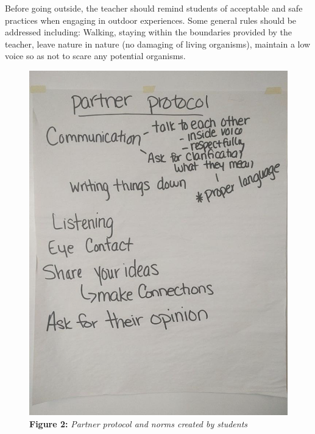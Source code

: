 \documentclass[11pt]{sig-alternate}
\begin{document}
\begin{large}
Before going outside, the teacher should remind students of acceptable and safe practices when engaging in outdoor experiences. Some general rules should be addressed including: Walking, staying within the boundaries provided by the teacher, leave nature in nature (no damaging of living organisms), maintain a low voice so as not to scare any potential organisms. 

\begin{figure}[h!]
    \centering
    \captionsetup{font=large}
    \caption*{\textbf{Figure 2:}\textit{ Partner protocol and norms created by students}}
    \label{Figure 2}
    \includegraphics[width=\columnwidth]{Figure 2a.png}
\end{figure}


\end{large}
\end{document}
